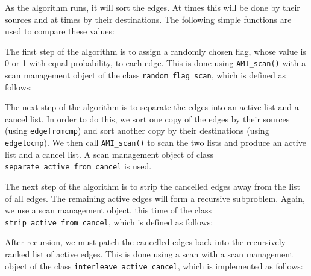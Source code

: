 As the algorithm runs, it will sort the edges.  At times this will be
done by their sources and at times by their destinations.  The
following simple functions are used to compare these values:



The first step of the algorithm is to assign a randomly chosen flag,
whose value is 0 or 1 with equal probability, to each edge.  This is
done using \lstinline|AMI_scan()| with a scan management object of the
class \lstinline|random_flag_scan|, which is defined as follows:



The next step of the algorithm is to separate the edges into an active
list and a cancel list.  In order to do this, we sort one copy of the
edges by their sources (using \lstinline|edgefromcmp|) and sort another copy by
their destinations (using \lstinline|edgetocmp|).  We then call
\lstinline|AMI_scan()| to scan the two lists and produce an active list and
a cancel list.  A scan management object of class
\lstinline|separate_active_from_cancel| is used.



The next step of the algorithm is to strip the cancelled edges away
from the list of all edges.  The remaining active edges will form a
recursive subproblem.  Again, we use a scan management object, this
time of the class \lstinline|strip_active_from_cancel|, which is defined as
follows:



After recursion, we must patch the cancelled edges back into the
recursively ranked list of active edges.  This is done using a scan
with a scan management object of the class
\lstinline|interleave_active_cancel|, which is implemented as follows:



